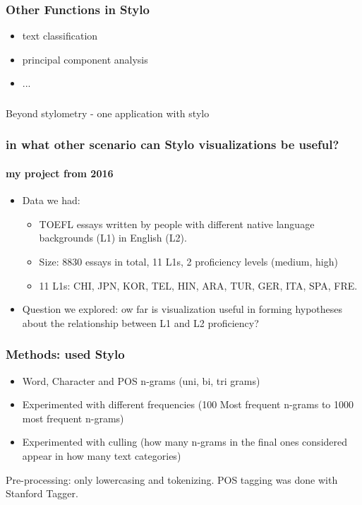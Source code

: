 \documentclass{beamer}
\begin{document}
\begin{frame}
\frametitle{Other Functions in Stylo}
\begin{itemize}
\item text classification
\item principal component analysis
\item ... 
\end{itemize}
\end{frame}

\begin{frame}
\frametitle{}
\Large Beyond stylometry - one application with stylo
\end{frame}

\begin{frame}
\frametitle{in what other scenario can Stylo visualizations be useful?}
\framesubtitle{my project from 2016}
\begin{itemize}
\item Data we had: 
\begin{itemize}
\item TOEFL essays written by people with different native language backgrounds (L1) in English (L2).
\item Size: 8830 essays in total, 11 L1s, 2 proficiency levels (medium, high)
\item 11 L1s: CHI, JPN, KOR, TEL, HIN, ARA, TUR, GER, ITA, SPA, FRE.
\end{itemize}
\item Question we explored: ow far is visualization useful in forming hypotheses about the relationship between L1 and L2 proficiency?
\end{itemize}
\end{frame}

\begin{frame}
\frametitle{Methods: used Stylo}
\begin{itemize}
\item Word, Character and POS n-grams (uni, bi, tri grams)
\item Experimented with different frequencies (100 Most frequent n-grams to 1000 most frequent n-grams)
\item Experimented with culling (how many n-grams in the final ones considered appear in how many text categories)
\end{itemize}
Pre-processing: only lowercasing and tokenizing. POS tagging was done with Stanford Tagger. 
\end{frame}
\end{document}
